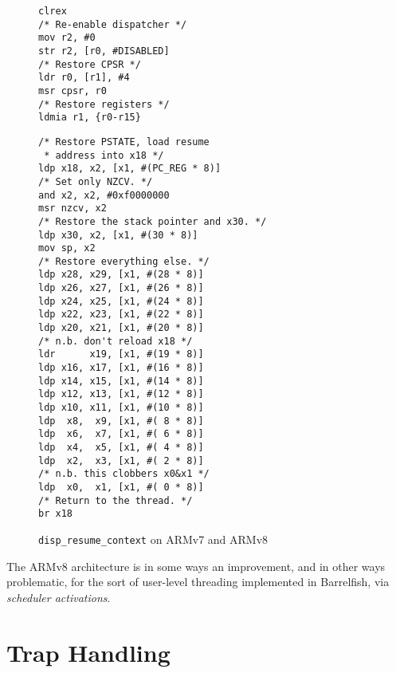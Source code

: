 \documentclass[a4paper,twoside]{report}
\begin{document}
\begin{figure}
\begin{center}
\begin{minipage}[t]{0.49\textwidth}
\begin{lstlisting}
clrex
/* Re-enable dispatcher */
mov r2, #0
str r2, [r0, #DISABLED]
/* Restore CPSR */
ldr r0, [r1], #4
msr cpsr, r0
/* Restore registers */
ldmia r1, {r0-r15}
\end{lstlisting}
\end{minipage}
\hfill
\begin{minipage}[t]{0.49\textwidth}
\begin{lstlisting}
/* Restore PSTATE, load resume
 * address into x18 */
ldp x18, x2, [x1, #(PC_REG * 8)]
/* Set only NZCV. */
and x2, x2, #0xf0000000
msr nzcv, x2
/* Restore the stack pointer and x30. */
ldp x30, x2, [x1, #(30 * 8)]
mov sp, x2
/* Restore everything else. */
ldp x28, x29, [x1, #(28 * 8)]
ldp x26, x27, [x1, #(26 * 8)]
ldp x24, x25, [x1, #(24 * 8)]
ldp x22, x23, [x1, #(22 * 8)]
ldp x20, x21, [x1, #(20 * 8)]
/* n.b. don't reload x18 */
ldr      x19, [x1, #(19 * 8)]
ldp x16, x17, [x1, #(16 * 8)]
ldp x14, x15, [x1, #(14 * 8)]
ldp x12, x13, [x1, #(12 * 8)]
ldp x10, x11, [x1, #(10 * 8)]
ldp  x8,  x9, [x1, #( 8 * 8)]
ldp  x6,  x7, [x1, #( 6 * 8)]
ldp  x4,  x5, [x1, #( 4 * 8)]
ldp  x2,  x3, [x1, #( 2 * 8)]
/* n.b. this clobbers x0&x1 */
ldp  x0,  x1, [x1, #( 0 * 8)]
/* Return to the thread. */
br x18
\end{lstlisting}
\end{minipage}
\end{center}
\caption{\texttt{disp\_resume\_context} on ARMv7 and ARMv8}
\label{f:disp_resume}
\end{figure}

The ARMv8 architecture is in some ways an improvement, and in other ways
problematic, for the sort of user-level threading implemented in Barrelfish,
via \textit{scheduler activations}.

\section{Trap Handling}\label{s:traps}
\end{document}
